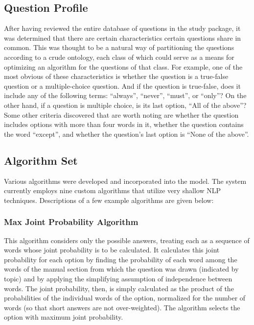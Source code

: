 \subsection{Question Profile}

After having reviewed the entire database of questions in the study package, it was determined that there are certain characteristics certain questions share in common.  This was thought to be a natural way of partitioning the questions according to a crude ontology, each class of which could serve as a means for optimizing an algorithm for the questions of that class.  For example, one of the most obvious of these characteristics is whether the question is a true-false question or a multiple-choice question.  And if the question is true-false, does it include any of the following terms:  ``always'', ``never'', ``must'', or ``only''?  On the other hand, if a question is multiple choice, is its last option, ``All of the above''?  Some other criteria discovered that are worth noting are whether the question includes options with more than four words in it, whether the question contains the word ``except'', and whether the question's last option is ``None of the above''.

\subsection{Algorithm Set}

Various algorithms were developed and incorporated into the model.  The system currently employs nine custom algorithms that utilize very shallow NLP techniques.  Descriptions of a few example algorithms are given below:

\subsubsection{Max Joint Probability Algorithm}

This algorithm considers only the possible answers, treating each as a sequence of words whose joint probability is to be calculated.  It calculates this joint probability for each option by finding the probability of each word among the words of the manual section from which the question was drawn (indicated by topic) and by applying the simplifying assumption of independence between words.  The joint probability, then, is simply calculated as the product of the probabilities of the individual words of the option, normalized for the number of words (so that short answers are not over-weighted).  The algorithm selects the option with maximum joint probability.

